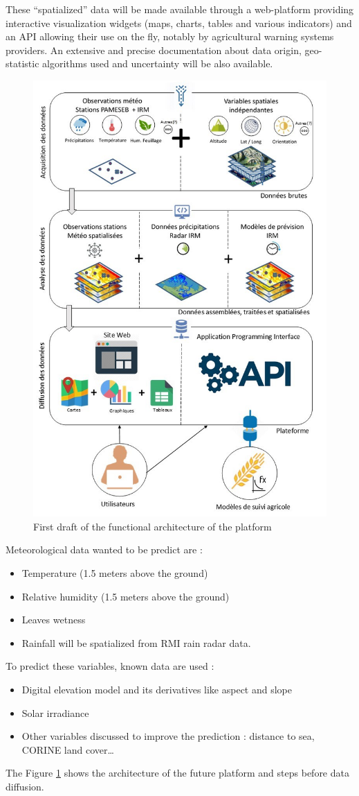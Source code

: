 \documentclass[12pt,twoside]{reedthesis}
\providecommand{\tightlist}{%
  \setlength{\itemsep}{0pt}\setlength{\parskip}{0pt}}
\theoremstyle{definition}
\theoremstyle{definition}
\theoremstyle{definition}
\theoremstyle{remark}
\begin{document}
These ``spatialized'' data will be made available through a web-platform
providing interactive visualization widgets (maps, charts, tables and
various indicators) and an API allowing their use on the fly, notably by
agricultural warning systems providers. An extensive and precise
documentation about data origin, geo-statistic algorithms used and
uncertainty will be also available.
\begin{figure}

{\centering \includegraphics[width=0.65\linewidth]{figure/agromet} 

}

\caption{First draft of the functional architecture of the platform}\label{fig:agromet}
\end{figure}
Meteorological data wanted to be predict are :
\begin{itemize}
\tightlist
\item
  Temperature (1.5 meters above the ground)
\item
  Relative humidity (1.5 meters above the ground)
\item
  Leaves wetness
\item
  Rainfall will be spatialized from RMI rain radar data.
\end{itemize}
To predict these variables, known data are used :
\begin{itemize}
\tightlist
\item
  Digital elevation model and its derivatives like aspect and slope
\item
  Solar irradiance
\item
  Other variables discussed to improve the prediction : distance to sea,
  CORINE land cover\ldots{}
\end{itemize}
The Figure \ref{fig:agromet} shows the architecture of the future
platform and steps before data diffusion.
\end{document}

